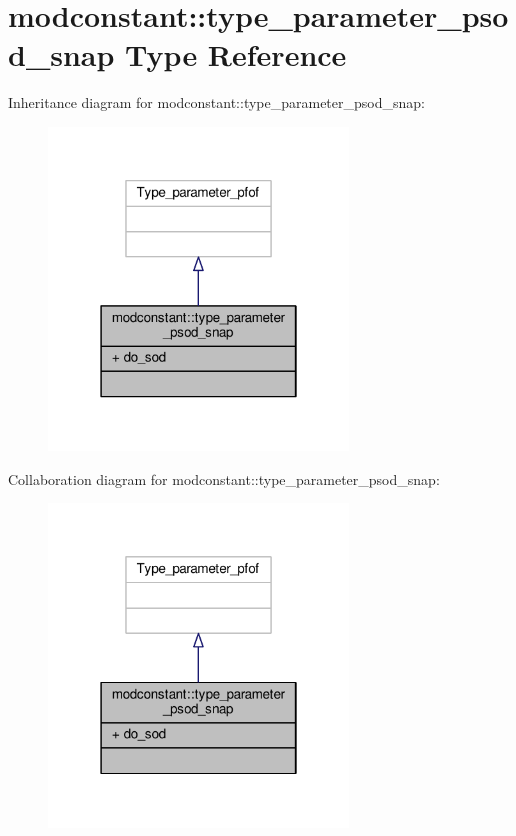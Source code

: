 \hypertarget{structmodconstant_1_1type__parameter__psod__snap}{}\section{modconstant\+:\+:type\+\_\+parameter\+\_\+psod\+\_\+snap Type Reference}
\label{structmodconstant_1_1type__parameter__psod__snap}


Inheritance diagram for modconstant\+:\+:type\+\_\+parameter\+\_\+psod\+\_\+snap\+:\nopagebreak
\begin{figure}[H]
\begin{center}
\leavevmode
\includegraphics[width=226pt]{structmodconstant_1_1type__parameter__psod__snap__inherit__graph}
\end{center}
\end{figure}


Collaboration diagram for modconstant\+:\+:type\+\_\+parameter\+\_\+psod\+\_\+snap\+:\nopagebreak
\begin{figure}[H]
\begin{center}
\leavevmode
\includegraphics[width=226pt]{structmodconstant_1_1type__parameter__psod__snap__coll__graph}
\end{center}
\end{figure}
